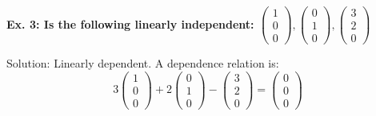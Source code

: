 \noindent
\newline
\textbf{Ex. 3: Is the following linearly independent: \(\begin{pmatrix}1 \\ 0 \\ 0\end{pmatrix}, \begin{pmatrix}0 \\ 1 \\ 0\end{pmatrix}, \begin{pmatrix}3 \\ 2 \\ 0\end{pmatrix}\)}

\noindent
\newline
Solution: Linearly dependent. A dependence relation is:
\begin{equation}
    3\begin{pmatrix}1 \\ 0 \\ 0\end{pmatrix} + 2\begin{pmatrix}0 \\ 1 \\ 0\end{pmatrix} - \begin{pmatrix}3 \\ 2 \\ 0\end{pmatrix} = \begin{pmatrix}0 \\ 0 \\ 0\end{pmatrix}
\end{equation}